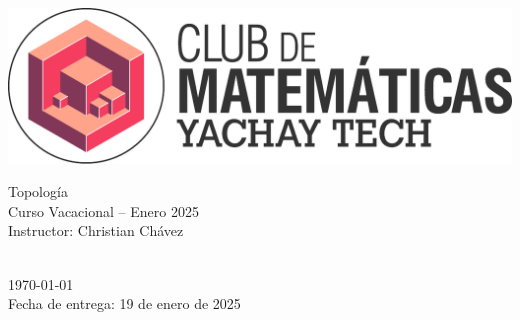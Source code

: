 




    




\begin{center}
\begin{minipage}{0.45\textwidth}
    \includegraphics[height=0.075\textheight]{images/LogoClubMate.pdf}
\end{minipage}%
\hfill
\begin{minipage}{0.5\textwidth}
    \begin{flushright}
        {\LARGE Topología} \\ Curso Vacacional -- Enero 2025 \\
        Instructor: Christian Chávez \\
    \end{flushright}
\end{minipage}

\vspace{\baselineskip}
{\huge\thetitle} \\

\today\\
Fecha de entrega: 19 de enero de 2025

\end{center}
